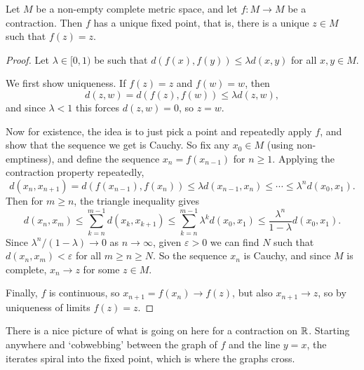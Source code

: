 \documentclass[a4paper]{scrartcl}
\begin{document}
\begin{theorem}\label{antop-thm:contraction}
    Let $M$ be a non-empty complete metric space, and let $f: M \rightarrow M$ be a contraction. Then $f$ has a unique fixed point, that is, there is a unique $z \in M$ such that $f(z) = z$.
\end{theorem}
\begin{proof}
    Let $\lambda \in [0, 1)$ be such that $d(f(x), f(y)) \leq \lambda d(x, y)$ for all $x, y \in M$.

    We first show uniqueness. If $f(z) = z$ and $f(w) = w$, then
    $$
    d(z, w) = d(f(z), f(w)) \leq \lambda d(z, w),
    $$
    and since $\lambda < 1$ this forces $d(z, w) = 0$, so $z = w$.

    Now for existence, the idea is to just pick a point and repeatedly apply $f$, and show that the sequence we get is Cauchy. So fix any $x_0 \in M$ (using non-emptiness), and define the sequence $x_n = f(x_{n - 1})$ for $n \geq 1$. Applying the contraction property repeatedly,
    $$
    d(x_n, x_{n + 1}) = d(f(x_{n-1}), f(x_n)) \leq \lambda d(x_{n - 1}, x_n) \leq \cdots \leq \lambda^n d(x_0, x_1).
    $$
    Then for $m \geq n$, the triangle inequality gives
    $$
    d(x_n, x_m) \leq \sum_{k = n}^{m - 1} d(x_k, x_{k + 1}) \leq \sum_{k = n}^{m - 1} \lambda^k d(x_0, x_1) \leq \frac{\lambda^n}{1 - \lambda} d(x_0, x_1).
    $$
    Since $\lambda^n/(1 - \lambda) \rightarrow 0$ as $n \rightarrow \infty$, given $\varepsilon > 0$ we can find $N$ such that $d(x_n, x_m) < \varepsilon$ for all $m \geq n \geq N$. So the sequence $x_n$ is Cauchy, and since $M$ is complete, $x_n \rightarrow z$ for some $z \in M$.

    Finally, $f$ is continuous, so $x_{n + 1} = f(x_n) \rightarrow f(z)$, but also $x_{n + 1} \rightarrow z$, so by uniqueness of limits $f(z) = z$.
\end{proof}

There is a nice picture of what is going on here for a contraction on $\mathbb{R}$. Starting anywhere and `cobwebbing' between the graph of $f$ and the line $y = x$, the iterates spiral into the fixed point, which is where the graphs cross.
\end{document}
